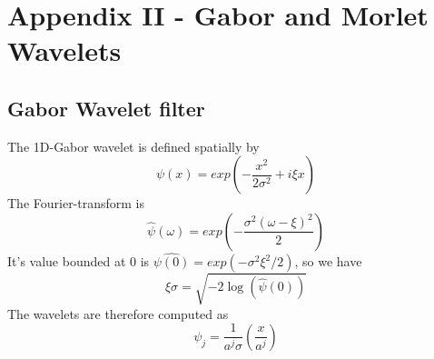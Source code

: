 \section*{Appendix II - Gabor and Morlet Wavelets}
\subsection*{Gabor Wavelet filter}
The 1D-Gabor wavelet is defined spatially by
\begin{equation}
    \psi(x)=exp\left(-\frac{x^2}{2\sigma^2}+i\xi x\right)
    \label{eqn_app2_wfil00}
\end{equation}
The Fourier-transform is
\begin{equation}
    \hat{\psi}(\omega)=exp\left(-\frac{\sigma^2(\omega-\xi)^2}{2}\right)
    \label{eqn_app2_wfil01}
\end{equation}
It's value bounded at 0 is $\hat{\psi(0)}=exp(-\sigma^2\xi^2/2)$, so we have
\begin{equation}
    \xi\sigma=\sqrt{-2\log(\hat{\psi}(0))}
    \label{eqn_app2_wfil02}
\end{equation}
The wavelets are therefore computed as 
\begin{equation}
    \psi_j=\frac{1}{a^j\sigma}\left(\frac{x}{a^j}\right)
    \label{eqn_app2_wfil03}
\end{equation}

